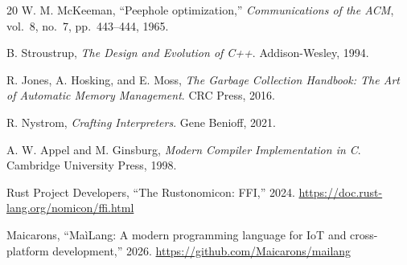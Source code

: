 \documentclass[10pt,a4paper]{article}
\begin{document}
\begin{thebibliography}{20}
W. M. McKeeman,
``Peephole optimization,''
\emph{Communications of the ACM}, vol.~8, no.~7, pp.~443--444, 1965.

B. Stroustrup,
\emph{The Design and Evolution of C++}.
Addison-Wesley, 1994.

R. Jones, A. Hosking, and E. Moss,
\emph{The Garbage Collection Handbook: The Art of Automatic Memory Management}.
CRC Press, 2016.

R. Nystrom,
\emph{Crafting Interpreters}.
Gene Benioff, 2021.

A. W. Appel and M. Ginsburg,
\emph{Modern Compiler Implementation in C}.
Cambridge University Press, 1998.

Rust Project Developers,
``The Rustonomicon: FFI,''
2024. \url{https://doc.rust-lang.org/nomicon/ffi.html}

Maicarons,
``MaìLang: A modern programming language for IoT and cross-platform development,''
2026. \url{https://github.com/Maicarons/mailang}

\end{thebibliography}
\end{document}
